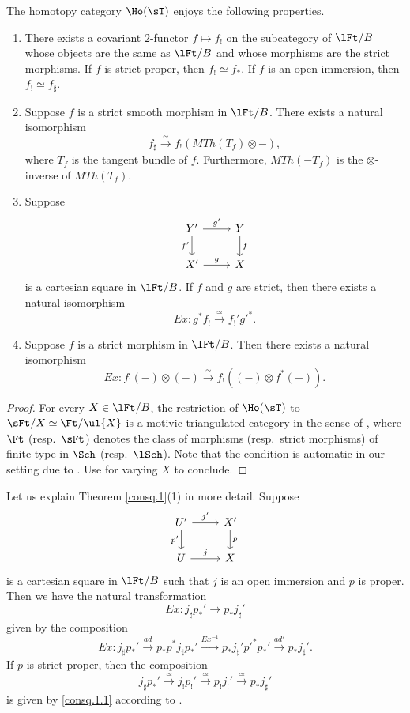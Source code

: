 \documentclass[10pt]{amsart}
\begin{document}
\begin{thm}
\label{consq.1}
The homotopy category $\Ho(\sT)$ enjoys the following properties.
\begin{enumerate}
\item[{\rm (1)}]
There exists a covariant $2$-functor $f\mapsto f_!$ on the subcategory of $\lFt/B$ whose objects are the same as $\lFt/B$ and whose morphisms are the strict morphisms.
If $f$ is strict proper, then $f_!\simeq f_*$.
If $f$ is an open immersion, then $f_!\simeq f_\sharp$.
\item[{\rm (2)}]
Suppose $f$ is a strict smooth morphism in $\lFt/B$.
There exists a natural isomorphism
\[
f_\sharp
\xrightarrow{\simeq}
f_! (MTh(T_f)\otimes -),
\]
where $T_f$ is the tangent bundle of $f$.
Furthermore, $MTh(-T_f)$ is the $\otimes$-inverse of $MTh(T_f)$.
\item[{\rm (3)}]
Suppose
\[
\begin{tikzcd}
Y'\ar[d,"f'"']\ar[r,"g'"]&
Y\ar[d,"f"]
\\
X'\ar[r,"g"]&
X
\end{tikzcd}
\]
is a cartesian square in $\lFt/B$.
If $f$ and $g$ are strict, then there exists a natural isomorphism
\[
Ex\colon g^*f_! \xrightarrow{\simeq} f_!'g'^*.
\]
\item[{\rm (4)}]
Suppose $f$ is a strict morphism in $\lFt/B$.
Then there exists a natural isomorphism
\[
Ex\colon f_!(-) \otimes (-) \xrightarrow{\simeq} f_!((-)\otimes f^*(-)).
\]
\end{enumerate}
\end{thm}
\begin{proof}
For every $X\in \lFt/B$, the restriction of $\Ho(\sT)$ to $\sFt/X\simeq \Ft/\ul{X}$ is a motivic triangulated category in the sense of \cite[Definition 2.4.45]{CD19}, where $\Ft$ (resp.\ $\sFt$) denotes the class of morphisms (resp.\ strict morphisms) of finite type in $\Sch$ (resp.\ $\lSch$).
Note that the condition \cite[Remark 2.4.47(1)]{CD19} is automatic in our setting due to \cite{zbMATH02242854}.
Use \cite[Theorem 2.4.50]{CD19} for varying $X$ to conclude.
\end{proof}

Let us explain Theorem \ref{consq.1}(1) in more detail.
Suppose
\[
\begin{tikzcd}
U'\ar[r,"j'"]\ar[d,"p'"']&
X'\ar[d,"p"]
\\
U\ar[r,"j"]&
X
\end{tikzcd}
\]
is a cartesian square in $\lFt/B$ such that $j$ is an open immersion and $p$ is proper.
Then we have the natural transformation
\begin{equation}
\label{consq.1.1}
Ex\colon j_\sharp p_*' \to p_*j_\sharp'
\end{equation}
given by the composition
\[
Ex\colon j_\sharp p_*'
\xrightarrow{ad}
p_*p^*j_\sharp p_*'
\xrightarrow{Ex^{-1}}
p_*j_\sharp' p'^* p_*'
\xrightarrow{ad'}
p_*j_\sharp'.
\]
If $p$ is strict proper, then the composition
\[
j_\sharp p_*' \xrightarrow{\simeq} j_!p_!'\xrightarrow{\simeq} p_!j_!' \xrightarrow{\simeq} p_*j_\sharp'
\]
is given by \eqref{consq.1.1} according to \cite[Section 2.2.a]{CD19}.
\end{document}
